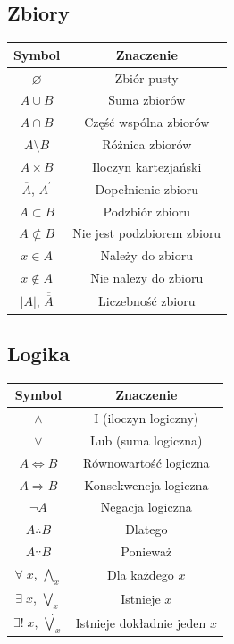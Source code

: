 \documentclass[14pt,a4paper]{extarticle}
\begin{document}
\begin{multicols}{2}
\subsection{Zbiory}

\begin{tabular}{*{2}{|c}|}
\hline
{} Symbol & Znaczenie \\
\hline
$\varnothing $ & Zbiór pusty \\
$A\cup B$ & Suma zbiorów \\
$A\cap B$ & Część wspólna zbiorów \\
$A\setminus B$ & Różnica zbiorów \\
$A\times B$ & Iloczyn kartezjański \\
$\overline{A}$, $A^\prime$ & Dopełnienie zbioru \\
$A\subset B$ & Podzbiór zbioru \\
$A\not\subset B$ & Nie jest podzbiorem zbioru \\
$x\in A$ & Należy do zbioru \\
$x\not\in A$ & Nie należy do zbioru \\
$\vert A\vert $, $\overline{\overline{A}}$ & Liczebność zbioru \\
\hline
\end{tabular}

\subsection{Logika}

\begin{tabular}{*{2}{|c}|}
\hline
{} Symbol & Znaczenie \\
\hline
$\land$ & I (iloczyn logiczny)\\
$\lor$ & Lub (suma logiczna) \\
$A\Leftrightarrow B$ & Równowartość logiczna \\
$A\Rightarrow B$ & Konsekwencja logiczna \\
$\lnot A$ & Negacja logiczna \\
$A\therefore B$ & Dlatego \\
$A\because B$ & Ponieważ \\
$\forall \;x$, $\underset{x}{\bigwedge}$ & Dla każdego $x$ \\
$\exists \;x$, $\underset{x}{\bigvee}$ & Istnieje $x$ \\
$\exists! \;x$, $\underset{x}{\dot\bigvee}$ & Istnieje dokładnie jeden $x$ \\
\hline
\end{tabular}

\end{multicols}
\newpage
\renewcommand{\arraystretch}{1.2}
\setlength{\arrayrulewidth}{0.5mm}
\end{document}
